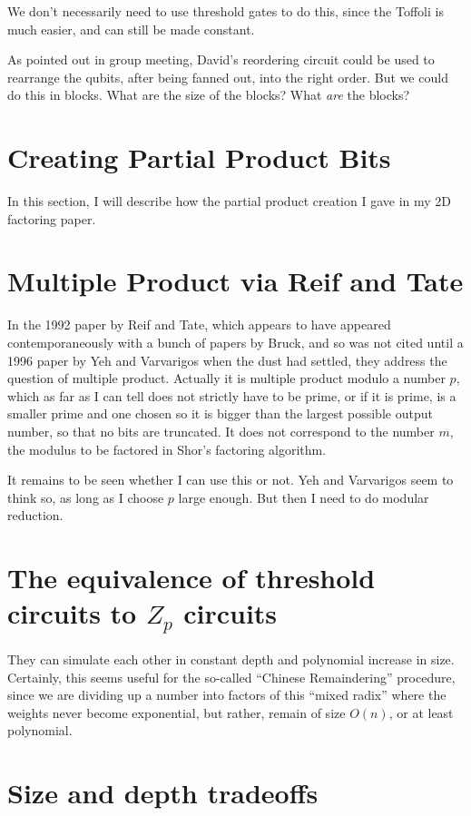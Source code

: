 \documentclass{article}
\begin{document}
We don't necessarily need to use threshold gates to do this, since the
Toffoli is much easier, and can still be made constant.

As pointed out in group meeting, David's reordering circuit could be
used to rearrange the qubits, after being fanned out, into the right
order. But we could do this in blocks. What are the size of the blocks?
What \emph{are} the blocks?

\section{Creating Partial Product Bits}

In this section, I will describe how the partial product creation I gave in
my 2D factoring paper.

\section{Multiple Product via Reif and Tate}

In the 1992 paper by Reif and Tate, which appears to have appeared
contemporaneously with a bunch of papers by Bruck, and so was not cited
until a 1996 paper by Yeh and Varvarigos when the dust had settled, they
address the question of multiple product. Actually it is multiple product
modulo a number $p$, which as far as I can tell does not strictly have to
be prime, or if it is prime, is a smaller prime and one chosen so it is
bigger than the largest possible output number, so that no bits are
truncated. It does not correspond to the number $m$, the modulus to be
factored in Shor's factoring algorithm.

It remains to be seen whether I can use this or not. Yeh and Varvarigos
seem to think so, as long as I choose $p$ large enough. But then I need
to do modular reduction.

\section{The equivalence of threshold circuits to $Z_p$ circuits}

They can simulate each other in constant depth and polynomial increase in 
size. Certainly, this seems useful for the so-called
``Chinese Remaindering'' procedure, since we are dividing up a number into
factors of this ``mixed radix'' where the weights never become exponential,
but rather, remain of size $O(n)$, or at least polynomial.

\section{Size and depth tradeoffs}
\end{document}
